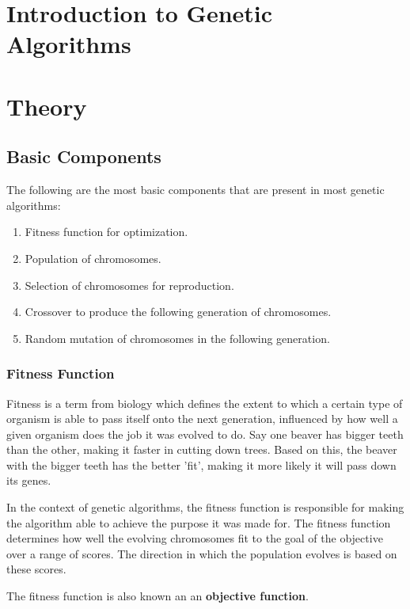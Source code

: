 \documentclass{article}
\begin{document}
\section{Introduction to Genetic Algorithms}
\newpage
\section{Theory}

\subsection{Basic Components}
The following are the most basic components that are present in most genetic algorithms:
\begin{enumerate}
    \item Fitness function for optimization.
    \item Population of chromosomes.
    \item Selection of chromosomes for reproduction.
    \item Crossover to produce the following generation of chromosomes.
    \item Random mutation of chromosomes in the following generation.
\end{enumerate}

\bigbreak
\subsubsection{Fitness Function}
Fitness is a term from biology which defines the extent to which a certain type of organism is able to pass itself onto the next generation, influenced by how well a given organism does the job it was evolved to do. Say one beaver has bigger teeth than the other, making it faster in cutting down trees. Based on this, the beaver with the bigger teeth has the better 'fit', making it more likely it will pass down its genes.

In the context of genetic algorithms, the fitness function is responsible for making the algorithm able to achieve the purpose it was made for. The fitness function determines how well the evolving chromosomes fit to the goal of the objective over a range of scores. The direction in which the population evolves is based on these scores.

The fitness function is also known an an \textbf{objective function}.

\bigbreak
\end{document}
